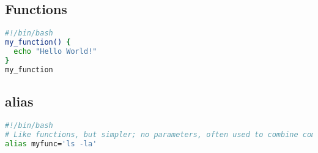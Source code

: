 \documentclass[a4paper,10pt]{article}
\begin{document}
\subsection{Functions}
\begin{lstlisting}[language=bash]
#!/bin/bash
my_function() {
  echo "Hello World!"
}
my_function
\end{lstlisting}

\subsection{alias}
\begin{lstlisting}[language=bash]
#!/bin/bash
# Like functions, but simpler; no parameters, often used to combine commands
alias myfunc='ls -la'
\end{lstlisting}
\end{document}

